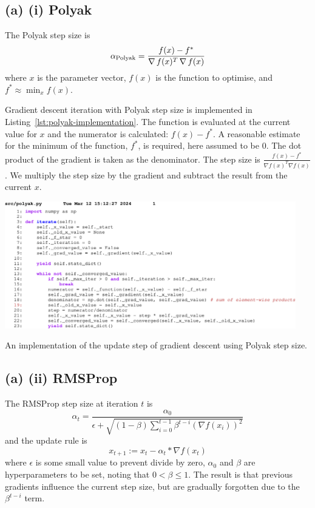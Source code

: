 \subsection{(a) (i) Polyak}

The Polyak step size is
\begin{equation}
  \alpha_{\text{Polyak}}=\frac{f(x)-f^*}{\operatorname*{\nabla} f(x)^T\operatorname*{\nabla} f(x)}
  \label{eq:polyak-step}
\end{equation}
where $x$ is the parameter vector, $f(x)$ is the function to optimise, and $f^*\approx\min_xf(x)$.

Gradient descent iteration with Polyak step size is implemented in Listing~\ref{lst:polyak-implementation}.
The function is evaluated at the current value for $x$ and the numerator is calculated: $f(x)-f^*$.
A reasonable estimate for the minimum of the function, $f^*$, is required, here assumed to be $0$.
The dot product of the gradient is taken as the denominator. The step size is $\frac{f(x)-f^*}{\nabla f(x)^T\nabla f(x)}$.
We multiply the step size by the gradient and subtract the result from the current $x$.
\begin{listing}
  \begin{center}
    \includegraphics[width=0.95\textwidth]{fig/polyak-code.pdf}
  \end{center}
  \caption{An implementation of the update step of gradient descent using Polyak step size.}\label{lst:polyak-implementation}
\end{listing}

\subsection{(a) (ii) RMSProp}

The RMSProp step size at iteration $t$ is
\begin{equation}
  \alpha_t=\frac{\alpha_0}{\epsilon +
  \sqrt{(1-\beta)\sum_{i=0}^{t-1}\beta^{t-i}(\nabla f(x_i))^2}}
\end{equation}
and the update rule is \begin{equation}
  x_{t+1}:=x_t-\alpha_t*\nabla f(x_t)
  \label{eq:rmsprop}
\end{equation}
where $\epsilon$ is some small value to prevent divide by zero, $\alpha_0$
and $\beta$ are hyperparameters to be set, noting that $0<\beta\le1$. The
result is that previous gradients influence the current step size, but are
gradually forgotten due to the $\beta^{t-i}$ term.

